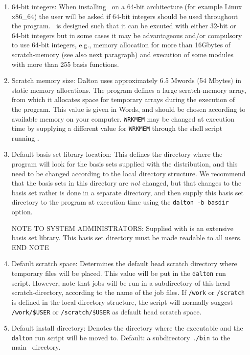 \begin{enumerate}
\item 64-bit integers:
When installing \dalton\ on a 64-bit architecture (for example Linux x86\_64) 
the user will be asked if 64-bit integers should be used throughout the program. 
\dalton\ is designed such that it can be excuted with either 32-bit or 64-bit 
integers but in some cases it may be advantageous and/or compulsory 
to use 64-bit integers, e.g., memory allocation for more than 16Gbytes  
of scratch-memory (see also next paragraph) and execution of some modules 
with more than 255 basis functions.

\item Scratch memory
size: Dalton uses approximately 6.5 Mwords (54 Mbytes)
in static memory allocations. The program defines a large scratch-memory
array, from which it allocates space for temporary arrays
during the execution of the program. This value is given in Words, and
should be chosen according to available memory on your computer.
\verb|WRKMEM| may be changed at execution time by supplying a
different value for \verb|WRKMEM| through the shell script running
{\dalton}.

\item Default basis set library
location: This defines the directory where the program will look for the
basis sets supplied with the distribution, and this need to be
changed according to the local directory structure. We recommend
that the basis sets in this directory are {\em not} changed, but
that changes to the basis set rather is done in a separate
directory, and then supply this basis set directory to the program
at execution time using the \verb|dalton -b basdir| option.

{\sc NOTE TO SYSTEM ADMINISTRATORS:} Supplied with {\dalton} is an
extensive basis set library. This basis set directory must be made
readable to all users. {\sc END NOTE}

\item Default scratch
space:
Determines the default head scratch
directory where temporary files will be placed. This value will be put
in the \verb|dalton| run script. However, note that jobs will be run in
a subdirectory of this head scratch-directory, according to the name
of the job files. If \verb|/work| or \verb|/scratch| is defined in the
local directory structure, the script will normally suggest
\verb|/work/$USER| or  \verb|/scratch/$USER| as default head scratch space.

\item Default install 
directory:
Denotes the directory where the {\dalton} executable and the
\verb|dalton| run script will be moved to.
Default: a subdirectory {\tt ./bin} to the main \dalton\ directory.
\end{enumerate}

